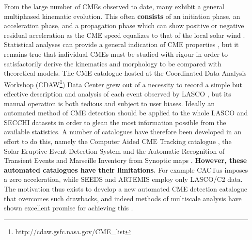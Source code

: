 \documentclass[preprint2]{aastex}
\begin{document}
From the large number of CMEs observed to date, many exhibit a general multiphased kinematic evolution. This often {\bf consists} of an initiation phase, an acceleration phase, and a propagation phase which can show positive or negative residual acceleration as the CME speed equalizes to that of the local solar wind \citep{2006ApJ...649.1100Z, 2009SoPh..256..149M}. Statistical analyses can provide a general indication of CME properties \citep[e.g.][]{2000GeoRL..27..145G, 2003AdSpR..32.2637D, 2005AnGeo..23.1033S}, but it remains true that individual CMEs must be studied with rigour in order to satisfactorily derive the kinematics and morphology to be compared with theoretical models. The CME catalogue hosted at the Coordinated Data Analysis Workshop (CDAW\footnote{http://cdaw.gsfc.nasa.gov/CME\_list}) Data Center grew out of a necessity to record a simple but effective description and analysis of each event observed by LASCO \citep{2009EM&P..104..295G}, but its manual operation is both tedious and subject to user biases. Ideally an automated method of CME detection should be applied to the whole LASCO and SECCHI datasets in order to glean the most information possible from the available statistics. A number of catalogues have therefore been developed in an effort to do this, namely the Computer Aided CME Tracking catalogue \citep[CACTus\footnote{http://sidc.oma.be/cactus/};][]{2004A&A...425.1097R}, the Solar Eruptive Event Detection System \citep[SEEDS\footnote{http://spaceweather.gmu.edu/seeds/};][]{2008SoPh..248..485O} and the Automatic Recognition of Transient Events and Marseille Inventory from Synoptic maps \citep[ARTEMIS\footnote{http://www.oamp.fr/lasco/};][]{2009SoPh..257..125B}. {\bf However, these automated catalogues have their limitations.} For example CACTus imposes a zero acceleration, while SEEDS and ARTEMIS employ only LASCO/C2 data. The motivation thus exists to develop a new automated CME detection catalogue that overcomes such drawbacks, and indeed methods of multiscale analysis have shown excellent promise for achieving this \citep{2009A&A...495..325B}.
\end{document}
